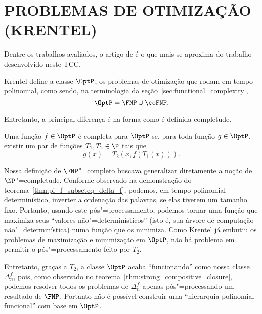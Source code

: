\section{PROBLEMAS DE OTIMIZAÇÃO (KRENTEL)}

Dentre os trabalhos avaliados,
o artigo de 
é o que mais se aproxima do trabalho desenvolvido neste TCC.

Krentel define a classe $\OptP$,
os problemas de otimização que rodam em tempo polinomial,
como sendo,
na terminologia da seção~\ref{sec:functional_complexity},
\begin{equation*}
    \OptP = \FNP \cup \coFNP.
\end{equation*}

Entretanto,
a principal diferença é na forma como é definida completude.
\begin{definition}
    Uma função $f \in \OptP$ é completa para $\OptP$
    se, para toda função $g \in \OptP$,
    existir um par de funções $T_1, T_2 \in \P$
    tais que
    \begin{equation*}
        g(x) = T_2( x, f(T_1(x)) ).
    \end{equation*}
\end{definition}

Nossa definição de $\FNP$"=completo
buscava generalizar diretamente a noção de $\NP$"=completude.
Conforme observado na demonstração do teorema~\ref{thm:pi_f_subseteq_delta_f},
podemos, em tempo polinomial determinístico,
inverter a ordenação das palavras, se elas tiverem um tamanho fixo.
Portanto,
usando este pós"=processamento,
podemos tornar uma função que maximiza seus ``valores não"=determinísticos''
(isto é, sua árvore de computação não"=determinística)
numa função que os minimiza.
Como Krentel já embutiu os problemas de maximização e minimização em $\OptP$,
não há problema em permitir o pós"=processamento feito por $T_2$.

Entretanto,
graças a $T_2$,
a classe $\OptP$ acaba ``funcionando'' como nossa classe $\Delta_n^f$,
pois,
como observado no teorema~\ref{thm:strong_compositive_closure},
podemos resolver todos os problemas de $\Delta_n^f$
apenas pós"=processando um resultado de $\FNP$.
Portanto não é possível construir uma ``hierarquia polinomial funcional''
com base em $\OptP$.

